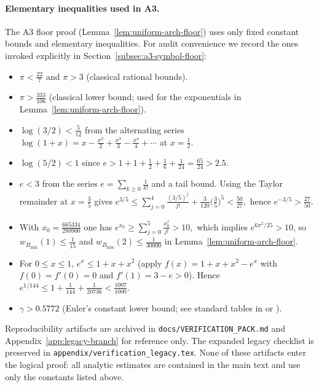 \paragraph{Elementary inequalities used in A3.}
The A3 floor proof (Lemma~\ref{lem:uniform-arch-floor}) uses only fixed constant bounds and
elementary inequalities. For audit convenience we record the ones invoked explicitly in
Section~\ref{subsec:a3-symbol-floor}:
\begin{itemize}[leftmargin=2.2em]
  \item $\pi<\tfrac{22}{7}$ and $\pi>3$ (classical rational bounds).
  \item $\pi>\tfrac{333}{106}$ (classical lower bound; used for the exponentials in Lemma~\ref{lem:uniform-arch-floor}).
  \item $\log(3/2)<\tfrac{5}{12}$ from the alternating series
  $\log(1+x)=x-\tfrac{x^2}{2}+\tfrac{x^3}{3}-\tfrac{x^4}{4}+\cdots$ at $x=\tfrac12$.
  \item $\log(5/2)<1$ since $e>1+1+\tfrac12+\tfrac16+\tfrac{1}{24}=\tfrac{65}{24}>2.5$.
  \item $e<3$ from the series $e=\sum_{k\ge0}\tfrac{1}{k!}$ and a tail bound. Using the Taylor remainder at $x=\tfrac35$ gives
  \(
    e^{3/5}
    \le \sum_{j=0}^{4}\frac{(3/5)^j}{j!}+\frac{3}{120}\Big(\frac{3}{5}\Big)^{5}
    <\frac{50}{27},
  \)
  hence $e^{-3/5}>\tfrac{27}{50}$.
  \item With $x_0=\frac{665334}{280900}$ one has
  \(
    e^{x_0}\ge \sum_{j=0}^{5}\frac{x_0^j}{j!}>10,
  \)
  which implies $e^{6\pi^2/25}>10$, so
  \(w_{B_{\min}}(1)\le \tfrac{1}{15}\) and \(w_{B_{\min}}(2)\le \tfrac{1}{30000}\) in Lemma~\ref{lem:uniform-arch-floor}.
  \item For $0\le x\le 1$, $e^x\le 1+x+x^2$ (apply $f(x)=1+x+x^2-e^x$ with
  $f(0)=f'(0)=0$ and $f'(1)=3-e>0$). Hence $e^{1/144}\le 1+\tfrac{1}{144}+\tfrac{1}{20736}<\tfrac{1007}{1000}$.
  \item $\gamma>0.5772$ (Euler's constant lower bound; see standard tables in
  \cite{Titchmarsh1986} or \cite{NISTDLMF}).
\end{itemize}

Reproducibility artifacts are archived in \texttt{docs/VERIFICATION\_PACK.md} and Appendix~\ref{app:legacy-branch} for reference only. The expanded legacy checklist is preserved in \texttt{appendix/verification\_legacy.tex}. None of these artifacts enter the logical proof: all analytic estimates are contained in the main text and use only the constants listed above.

\endgroup
